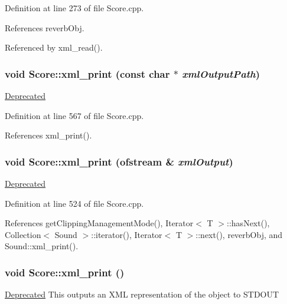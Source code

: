 Definition at line 273 of file Score.cpp.

References reverb\-Obj.

Referenced by xml\_\-read().\hypertarget{classScore_a8}{
\subsubsection[xml\_\-print]{\setlength{\rightskip}{0pt plus 5cm}void Score::xml\_\-print (const char $\ast$ {\em xml\-Output\-Path})}}
\label{classScore_a8}


\begin{Desc}
\item[\hyperlink{deprecated__deprecated000031}{Deprecated}]\end{Desc}


Definition at line 567 of file Score.cpp.

References xml\_\-print().\hypertarget{classScore_a7}{
\subsubsection[xml\_\-print]{\setlength{\rightskip}{0pt plus 5cm}void Score::xml\_\-print (ofstream \& {\em xml\-Output})}}
\label{classScore_a7}


\begin{Desc}
\item[\hyperlink{deprecated__deprecated000030}{Deprecated}]\end{Desc}


Definition at line 524 of file Score.cpp.

References get\-Clipping\-Management\-Mode(), Iterator$<$ T $>$::has\-Next(), Collection$<$ Sound $>$::iterator(), Iterator$<$ T $>$::next(), reverb\-Obj, and Sound::xml\_\-print().\hypertarget{classScore_a6}{
\subsubsection[xml\_\-print]{\setlength{\rightskip}{0pt plus 5cm}void Score::xml\_\-print ()}}
\label{classScore_a6}


\begin{Desc}
\item[\hyperlink{deprecated__deprecated000029}{Deprecated}]This outputs an XML representation of the object to STDOUT \end{Desc}


